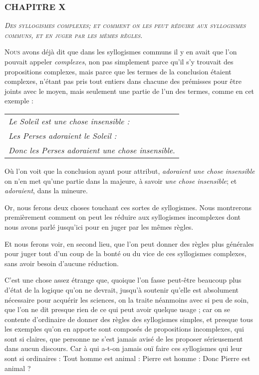 \subsubsection{\centering \Large CHAPITRE X}
\begin{center}\emph{\large\scshape Des syllogismes complexes; et comment on les peut réduire aux syllogismes communs, et en juger par les mêmes règles.}\end{center}

	\lettrine{N}{ous} avons déjà dit que dans les syllogismes communs il y en avait que l'on pouvait appeler \emph{complexes}, non pas simplement parce qu'il s'y trouvait des propositions complexes, mais parce que les termes de la conclusion étaient complexes, n'étant pas pris tout entiers dans chacune des prémisses pour être joints avec le moyen, mais seulement une partie de l'un des termes, comme en cet exemple :

\begin{center}
	\begin{tabular}{l}
		\emph{Le Soleil est une chose insensible :} \\
		\emph{Les Perses adoraient le Soleil :} \\
		\emph{Donc les Perses adoraient une chose insensible}. \\
	\end{tabular}
\end{center}

Où l'on voit que la conclusion ayant pour attribut, \emph{adoraient une chose insensible} on n'en met qu'une partie dans la majeure, à savoir \emph{une chose insensible}; et \emph{adoraient}, dans la mineure.

Or, nous ferons deux choses touchant ces sortes de syllogismes. Nous montrerons premièrement comment on peut les réduire aux syllogismes incomplexes dont nous avons parlé jusqu'ici pour en juger par les mêmes règles.

Et nous ferons voir, en second lieu, que l'on peut donner des règles plus générales pour juger tout d'un coup de la bonté ou du vice de ces syllogismes complexes, sans avoir besoin d'aucune réduction.

C'est une chose assez étrange que, quoique l'on fasse peut-être beaucoup plus d'état de la logique qu'on ne devrait, jusqu'à soutenir qu'elle est absolument nécessaire pour acquérir les sciences, on la traite néanmoins avec si peu de soin, que l'on ne dit presque rien de ce qui peut avoir quelque usage ; car on se contente d'ordinaire de donner des règles des syllogismes simples, et presque tous les exemples qu'on en apporte sont composés de propositions incomplexes, qui sont si claires, que personne ne s'est jamais avisé de les proposer sérieusement dans aucun discours. Car à qui a-t-on jamais ouï faire ces syllogismes qui leur sont si ordinaires : Tout homme est animal : Pierre est homme : Donc Pierre est animal ?

